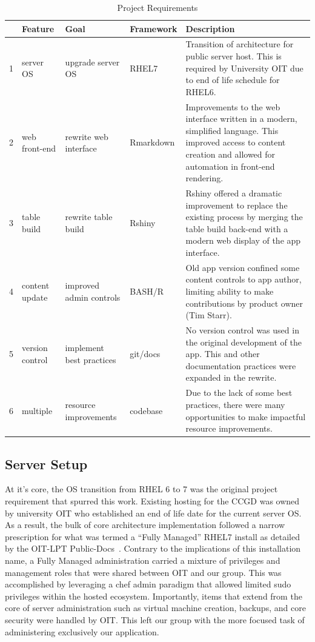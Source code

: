 \documentclass[10pt]{report}
\begin{document}
\begin{table}[H]
    \caption{Project Requirements}\label{table:projectReqs}
    \addtolength\tabcolsep{-0.2em}
    \begin{tabular}{llllp{7cm}}
        \toprule
        &Feature&Goal&Framework&Description\\
        \midrule
        1&server OS&upgrade server OS&RHEL7&Transition of architecture for public server host. This is required by University OIT due to end of life schedule for RHEL6.\\
        \midrule
        2&web front-end&rewrite web interface&Rmarkdown&Improvements to the web interface written in a modern, simplified language. This improved access to content creation and allowed for automation in front-end rendering.\\
        \midrule
        3&table build&rewrite table build&Rshiny&Rshiny offered a dramatic improvement to replace the existing process by merging the table build back-end with a modern web display of the app interface.\\
        \midrule
        4&content update&improved admin controls&BASH/R&Old app version confined some content controls to app author, limiting ability to make contributions by product owner (Tim Starr).\\
        \midrule
        5&version control&implement best practices&git/docs&No version control was used in the original development of the app. This and other documentation practices were expanded in the rewrite.\\
        \midrule
        6&multiple&resource improvements&codebase&Due to the lack of some best practices, there were many opportunities to make impactful resource improvements.\\
        \bottomrule
    \end{tabular}
    \addtolength\tabcolsep{+0.2em}
\end{table}

\subsection{Server Setup}
At it's core, the OS transition from RHEL 6 to 7 was the original project requirement that spurred this work. Existing hosting for the CCGD was owned by university OIT who established an end of life date for the current server OS\@. As a result, the bulk of core architecture implementation followed a narrow prescription for what was termed a ``Fully Managed'' RHEL7 install as detailed by the OIT-LPT Public-Docs~\cite{oitOITLPTPublicDocsThis}. Contrary to the implications of this installation name, a Fully Managed administration carried a mixture of privileges and management roles that were shared between OIT and our group. This was accomplished by leveraging a chef admin paradigm that allowed limited sudo privileges within the hosted ecosystem. Importantly, items that extend from the core of server administration such as virtual machine creation, backups, and core security were handled by OIT\@. This left our group with the more focused task of administering exclusively our application.
\end{document}
